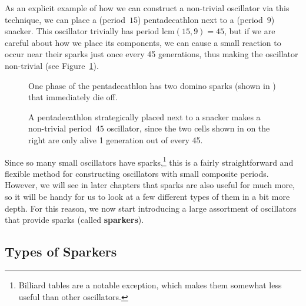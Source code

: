 As an explicit example of how we can construct a non-trivial oscillator via this technique, we can place a (period~$15$) pentadecathlon next to a (period~$9$) snacker. This oscillator trivially has period $\mathrm{lcm}(15,9) = 45$, but if we are careful about how we place its components, we can cause a small reaction to occur near their sparks just once every 45 generations, thus making the oscillator non-trivial (see Figure~\ref{fig:pentadecathlon_on_snacker}).

\begin{figure}[!htb]
	\centering
	\begin{minipage}[b]{.35\textwidth}
		\centering
		\caption{One phase of the pentadecathlon has two domino sparks (shown in ) that immediately die off.}\label{fig:pentadecathlon_spark}
	\end{minipage} \hfill %
	\begin{minipage}[b]{.61\textwidth}
		\centering{}
		\caption{A pentadecathlon strategically placed next to a snacker makes a non-trivial period~$45$ oscillator, since the two cells shown in  on the right are only alive 1 generation out of every 45.}\label{fig:pentadecathlon_on_snacker}
	\end{minipage}
\end{figure}

Since so many small oscillators have sparks,\footnote{Billiard tables are a notable exception, which makes them somewhat less useful than other oscillators.} this is a fairly straightforward and flexible method for constructing oscillators with small composite periods. However, we will see in later chapters that sparks are also useful for much more, so it will be handy for us to look at a few different types of them in a bit more depth. For this reason, we now start introducing a large assortment of oscillators that provide sparks (called \textbf{sparkers}).


\subsection{Types of Sparkers}\label{sec:sparkers}

